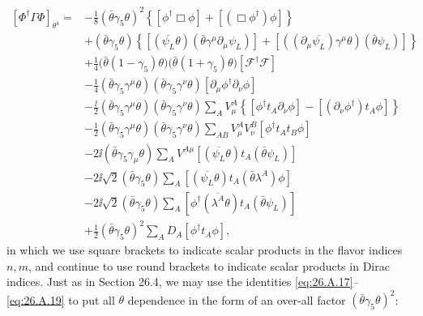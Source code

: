\[
  \begin{aligned}
  \left[\Phi^\dagger\Gamma\Phi\right]_{\theta^4}
  ={}&-\frac18(\bar\theta\gamma_5\theta)^2
  \left\{
    [\phi^\dagger\Box\phi]+[(\Box\phi^\dagger)\phi]
  \right\}
  \\
  &+(\bar\theta\gamma_5\theta)
  \left\{
    [(\overline{\psi_L}\theta)(\bar\theta\gamma^\mu
      \partial_\mu\psi_L)]
    +[((\partial_\mu\overline{\psi_L})\gamma^\mu\theta)
      (\bar\theta\psi_L)]
  \right\}
  \\
  &+\frac14\bigl(\bar\theta(1-\gamma_5)\theta\bigr)
    \bigl(\bar\theta(1+\gamma_5)\theta\bigr)
    [\mathcal{F}^\dagger\mathcal{F}]
  \\
  &-\frac14(\bar\theta\gamma_5\gamma^\mu\theta)
    (\bar\theta\gamma_5\gamma^\nu\theta)
    [\partial_\mu\phi^\dagger\partial_\nu\phi]
  \\
  &-\frac{\ii}{2}(\bar\theta\gamma_5\gamma^\mu\theta)
    (\bar\theta\gamma_5\gamma^\nu\theta)
    \sum_A V^A_\mu
    \left\{
      [\phi^\dagger t_A\partial_\nu\phi]
      -[(\partial_\nu\phi^\dagger)t_A\phi]
    \right\}
  \\
  &-\frac12(\bar\theta\gamma_5\gamma^\mu\theta)
    (\bar\theta\gamma_5\gamma^\nu\theta)
    \sum_{AB}V^A_\mu V^B_\nu[\phi^\dagger t_At_B\phi]
  \\
  &-2\ii(\bar\theta\gamma_5\gamma_\mu\theta)
    \sum_A V^{A\mu}
    [(\overline{\psi_L}\theta)t_A(\bar\theta\psi_L)]
  \\
  &-2\ii\sqrt{2}(\bar\theta\gamma_5\theta)
    \sum_A[(\overline{\psi_L}\theta)t_A
      (\bar\theta\lambda^A)\phi]
  \\
  &-2\ii\sqrt{2}(\bar\theta\gamma_5\theta)
    \sum_A[\phi^\dagger(\overline{\lambda^A}\theta)t_A
      (\bar\theta\psi_L)]
  \\
  &+\frac12(\bar\theta\gamma_5\theta)^2
    \sum_A D_A[\phi^\dagger t_A\phi],
  \end{aligned}
\]
in which we use square brackets to indicate scalar products in the flavor
indices \(n,m\), and continue to use round brackets to indicate scalar
products in Dirac indices. Just as in Section 26.4, we may use the
identities \eqref{eq:26.A.17}--\eqref{eq:26.A.19} to put all \(\theta\)
dependence in the form of an over-all factor
\((\bar\theta\gamma_5\theta)^2\):
